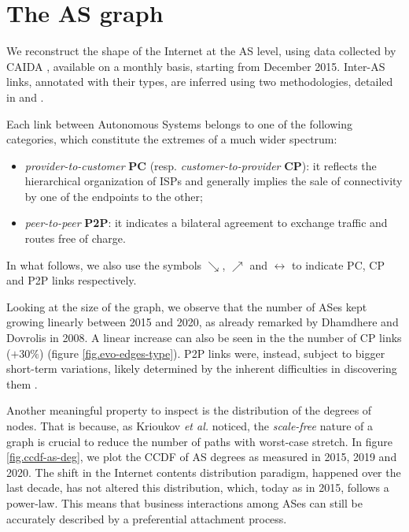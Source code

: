 \documentclass[a4paper,11pt,oneside]{report}
\begin{document}
\chapter{The AS graph}
\label{chap.as-graph}

We reconstruct the shape of the Internet at the AS level, using data collected by CAIDA \cite{GraphCAIDA}, available on a monthly basis, starting from December 2015. Inter-AS links, annotated with their types, are inferred using two methodologies, detailed in \cite{luckieRelationshipsCustomerCones2013} and \cite{giotsasInferringMultilateralPeering2013}.

\bigskip
Each link between Autonomous Systems belongs to one of the following categories, which constitute the extremes of a much wider spectrum:
\begin{itemize}
\item \emph{provider-to-customer} \textbf{PC} (resp. \emph{customer-to-provider} \textbf{CP}): it reflects the hierarchical organization of ISPs and generally implies the sale of connectivity by one of the endpoints to the other;
\item \emph{peer-to-peer} \textbf{P2P}: it indicates a bilateral agreement to exchange traffic and routes free of charge.
\end{itemize}
In what follows, we also use the symbols $\searrow$, $\nearrow$ and $\longleftrightarrow$ to indicate PC, CP and P2P links respectively.

\bigskip
Looking at the size of the graph, we observe that the number of ASes kept growing linearly between 2015 and 2020, as already remarked by Dhamdhere and Dovrolis \cite{dhamdhereTenYearsEvolution2008} in 2008. A linear increase can also be seen in the the number of CP links ($+30\%$) (figure \ref{fig.evo-edges-type}). P2P links were, instead, subject to bigger short-term variations, likely determined by the inherent difficulties in discovering them \cite{dhamdhereTenYearsEvolution2008}.

\bigskip
Another meaningful property to inspect is the distribution of the degrees of nodes. That is because, as Krioukov \textit{et al.} \cite{krioukovCompactRoutingInternet2007} noticed, the \emph{scale-free} nature of a graph is crucial to reduce the number of paths with worst-case stretch. In figure \ref{fig.ccdf-as-deg}, we plot the CCDF of AS degrees as measured in 2015, 2019 and 2020. The shift in the Internet contents distribution paradigm, happened over the last decade, has not altered this distribution, which, today as in 2015, follows a power-law. This means that business interactions among ASes can still be accurately described by a preferential attachment process.
\end{document}
